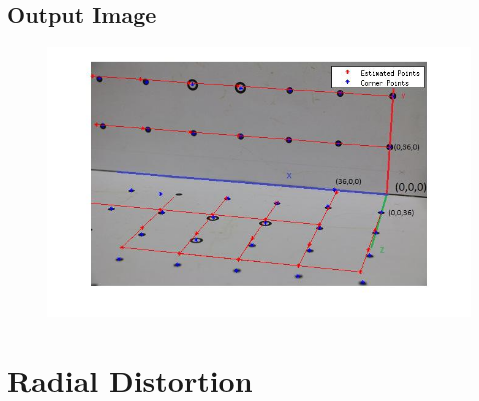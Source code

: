 \documentclass[12pt]{article}
\begin{document}
\subsection{Output Image}
\begin{figure}[htp]
\centering
\includegraphics[width=1\textwidth]{wireFrameRANSAC.jpg}\hfill
\end{figure}
\clearpage


\section{Radial Distortion}
\end{document}
